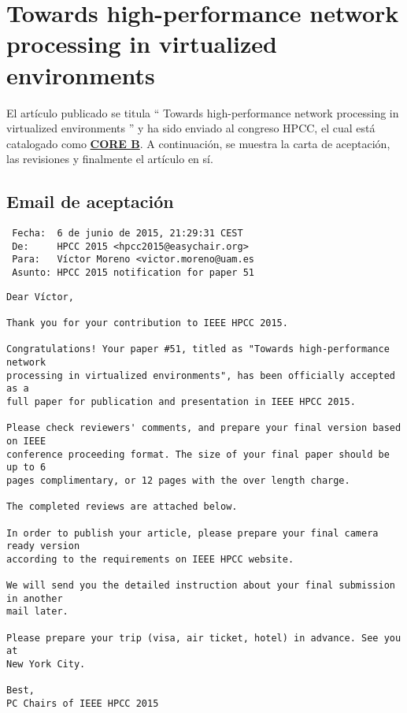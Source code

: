 \chapter{Towards high-performance network processing in virtualized environments\label{sec:HPCC}}

El artículo publicado se titula `` Towards high-performance network processing in virtualized environments '' y ha sido enviado al congreso HPCC, el cual está catalogado como \textbf{\href{http://103.1.187.206/core/?search=hpcc&by=all&source=CORE2014&sort=atitle&page=1}{CORE B}}. A continuación, se muestra la carta de aceptación, las revisiones y finalmente el artículo en sí.

\section{Email de aceptación}

\begin{verbatim}
 Fecha:	 6 de junio de 2015, 21:29:31 CEST
 De:	 HPCC 2015 <hpcc2015@easychair.org>
 Para:	 Víctor Moreno <victor.moreno@uam.es
 Asunto: HPCC 2015 notification for paper 51
\end{verbatim}
\begin{verbatim}
Dear Víctor,

Thank you for your contribution to IEEE HPCC 2015.

Congratulations! Your paper #51, titled as "Towards high-performance network
processing in virtualized environments", has been officially accepted as a
full paper for publication and presentation in IEEE HPCC 2015.

Please check reviewers' comments, and prepare your final version based on IEEE
conference proceeding format. The size of your final paper should be up to 6
pages complimentary, or 12 pages with the over length charge.

The completed reviews are attached below.

In order to publish your article, please prepare your final camera ready version
according to the requirements on IEEE HPCC website. 

We will send you the detailed instruction about your final submission in another
mail later.

Please prepare your trip (visa, air ticket, hotel) in advance. See you at
New York City.

Best,
PC Chairs of IEEE HPCC 2015
\end{verbatim}


